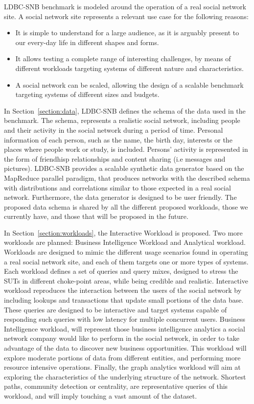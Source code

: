 LDBC-SNB benchmark is modeled around the operation of a real social network
site. A social network site represents a relevant use case for the following
reasons:

\begin{itemize}
    \item It is simple to understand for a large audience, as it is 
        arguably present to our every-day life in different shapes and forms.  
    \item It allows testing a complete range of interesting
        challenges, by means of different workloads targeting systems of
        different nature and characteristics.
    \item A social network can be scaled, allowing the design of a
        scalable benchmark targeting systems of different sizes and budgets.
\end{itemize}

In Section~\ref{section:data}, LDBC-SNB defines the schema of the data used in
the benchmark. The schema, represents a realistic social network, including
people and their activity in the social network during a period of time.
Personal information of each person, such as the name, the birth day, interests
or the places where people work or study, is included. Persons' activity is
represented in the form of friendhisp relationships and content sharing (i.e
messages and pictures). LDBC-SNB provides a scalable synthetic data generator
based on the MapReduce parallel paradigm, that produces networks with the
described schema with distributions and correlations similar to those expected
in a real social network. Furthermore, the data generator is designed to be
user friendly. The proposed data schema is shared by all the different proposed
workloads, those we currently have, and those that will be proposed in the future.

In Section~\ref{section:workloads}, the Interactive Workload is proposed. 
Two more workloads are planned:  Business Intelligence Workload and
Analytical workload. Workloads are designed to mimic the different usage
scenarios found in operating a real social network site, and each of them
targets one or more types of systems.  Each workload defines a set of queries
and query mixes, designed to stress the SUTs in different choke-point areas,
while being credible and realistic. Interactive workload reproduces the
interaction between the users of the social network by including lookups and
transactions that update small portions of the data base.  These queries are
designed to be interactive and target systems capable of responding such
queries with low latency for multiple concurrent users. Business Intelligence
workload, will represent those business intelligence analytics a social
network company would like to perform in the social network, in order to take
advantage of the data to discover new business opportunities. This workload
will explore moderate portions of data from different entities, and performing more
resource intensive operations. Finally, the graph analytics workload will aim at
exploring the characteristics of the underlying structure of the network. Shortest
paths, community detection or centrality, are representative queries of this workload,
and will imply touching a vast amount of the dataset.
 

